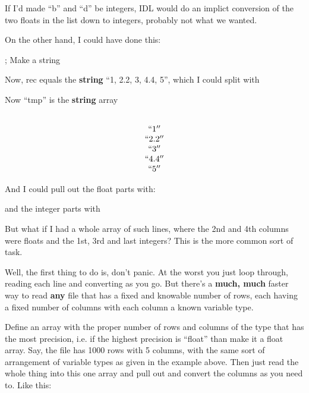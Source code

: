 \begin{itemize}
\begin{itemize}
	    If I'd made ``b'' and ``d'' be integers, IDL would do an
	   implict conversion of the two floats in the list down to
	   integers, probably not what we wanted.

	   On the other hand, I could have done this:

            ; Make a string\\

	    Now, rec equals the \textbf{string}
            ``1, 2.2, 3, 4.4, 5'', which I could split with


	     Now ``tmp'' is the \textbf{string} array

   \[ \begin{array}{c}\\
        ``1'' \\
        ``2.2'' \\
        ``3'' \\
	``4.4'' \\
	``5'' \\
	 \end{array} \]

         And I could pull out the float parts with:


	and the integer parts with 


	But what if I had a whole array of such lines, where the 2nd
        and 4th columns were floats and the 1st, 3rd and last
	integers? This is the more common sort of task.

        Well, the first thing to do is, don't panic. At the worst you
	just loop through, reading each line and  converting as you
        go. But there's a \textbf{much, much} faster way to read \textbf{any}
        file that has a fixed and knowable number of rows, each having
        a fixed number of columns with each column a known variable type.

	Define an array with the proper number of rows and columns of
        the type that has the most precision, i.e. if the highest
        precision is ``float'' than make it a float array. Say, the
        file has 1000 rows with 5 columns, with the same sort of
        arrangement of variable types as given in the example
        above. Then just read the whole thing into this one array and
        pull out and convert the columns as you need to. Like this:


\end{itemize}
\end{itemize}
